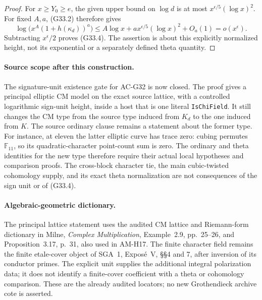 \begin{proof}
For $x\geq Y_0\geq e$, the given upper bound on $\log d$
is at most $x^{\epsilon/5}(\log x)^2$.
For fixed $A,a$, (G33.2) therefore gives
\[
 \log\bigl(x^A(1+h(\kappa_d))^a\bigr)
     \leq A\log x+a x^{\epsilon/5}(\log x)^2+O_a(1)
                         =o(x^\epsilon).
\]
Subtracting $x^\epsilon/2$ proves (G33.4).
The assertion is about this explicitly normalized height,
not its exponential or a separately defined theta quantity.
\end{proof}

\paragraph{Source scope after this construction.}
The signature-unit existence gate for AC-G32 is now closed.
The proof gives a principal elliptic CM model on the exact
source lattice, with a controlled logarithmic sign-unit height,
inside a host that is one literal \texttt{IsChiField}.
It still changes the CM type from the source type induced
from $K_d$ to the one induced from $K$.
The source ordinary clause remains a statement about the
former type.  For instance, at eleven the latter elliptic
curve has trace zero: cubing permutes $\mathbb F_{11}$,
so its quadratic-character point-count sum is zero.
The ordinary and theta identities for the new type therefore
require their actual local hypotheses and comparison proofs.
The cross-block character tie, the main cubic-twisted
cohomology supply, and its exact theta normalization are
not consequences of the sign unit or of (G33.4).

\paragraph{Algebraic-geometric dictionary.}
The principal lattice statement uses the audited CM lattice
and Riemann-form dictionary in Milne,
\emph{Complex Multiplication}, Example~2.9, pp.~25--26,
and Proposition~3.17, p.~31, also used in AM-H17.
The finite character field remains the finite etale-cover
object of SGA~1, Expos\'e~V, \S\S4 and 7, after inversion
of its conductor primes.  The explicit unit supplies the
additional integral polarization data; it does not identify
a finite-cover coefficient with a theta or cohomology
comparison.  These are the already audited locators;
no new Grothendieck archive cote is asserted.

